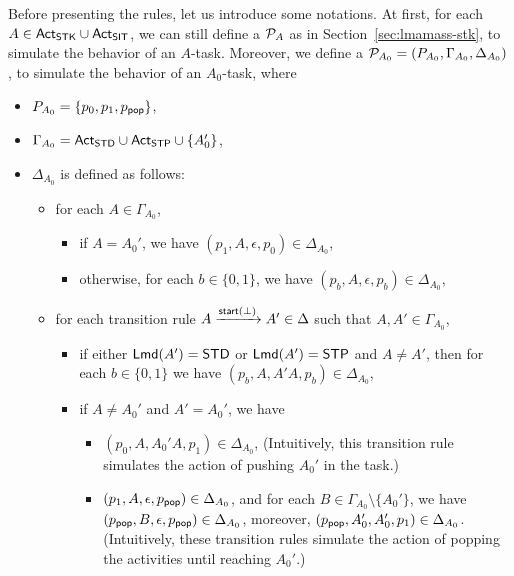 Before presenting the rules, let us introduce some notations. At first, for each $A \in {\sf Act}_{\sf STK} \cup {\sf Act}_{\sf SIT}$, we can still define a {\PDS} ${\mathcal{P} }_A$ as in Section~\ref{sec:lmamass-stk}, to simulate the behavior of an $A$-task. 
Moreover, we define a {\PDS} ${\mathcal{P} }_{A_0}=(P_{A_0}, \Gamma_{A_0},\Delta_{A_0})$, to simulate the behavior of an $A_0$-task,  where
\begin{itemize}
    \item $P_{A_0} = \{p_0,p_1,p_{\mathsf{pop}}\}$,
    \item $\Gamma_{A_0} = {\sf Act}_{\sf STD} \cup {\sf Act}_{\sf STP} \cup \{A_0'\}$,
    \item $\Delta_{A_0}$ is defined as follows:
    \begin{itemize}
        \item for each $A\in\Gamma_{A_0}$, 
            \begin{itemize}
                \item if $A=A_0'$, we have $(p_1,A,\epsilon,p_0)\in\Delta_{A_0}$,
                \item otherwise, for each $b\in\{0,1\}$, we have $(p_b,A,\epsilon,p_b)\in\Delta_{A_0}$, 
            \end{itemize}
        \item for each transition rule $A\xrightarrow{{\mathsf{start} }(\bot)}A' \in \Delta$ such that $A, A' \in \Gamma_{A_0}$,
        \begin{itemize}
            \item if either ${\sf Lmd}(A') = \mathsf{STD}$ or ${\sf Lmd}(A')=\mathsf{STP}$ and $A\neq A'$, then for each $b\in\{0,1\}$ we have $(p_b,A,A'A,p_b)\in\Delta_{A_0}$,
            \item if $A\neq A_0'$ and $A'=A_0'$, we have 
            \begin{itemize}
                \item $(p_0, A, A_0'A, p_1) \in \Delta_{A_0}$, (Intuitively, this transition rule simulates the action of pushing $A_0'$ in the task.)
                \item $(p_1, A, \epsilon, p_{\mathsf{pop}}) \in \Delta_{A_0}$, and for each $B\in\Gamma_{A_0}\setminus\{A_0'\}$, we have $(p_{\mathsf{pop}},B,\epsilon,p_{\mathsf{pop}})\in\Delta_{A_0}$, moreover, $(p_{\mathsf{pop}},A_0',A_0',p_1)\in\Delta_{A_0}$. (Intuitively, these transition rules simulate the action of popping the activities until reaching $A_0'$.)
            \end{itemize}
        \end{itemize}
    \end{itemize}
\end{itemize}

